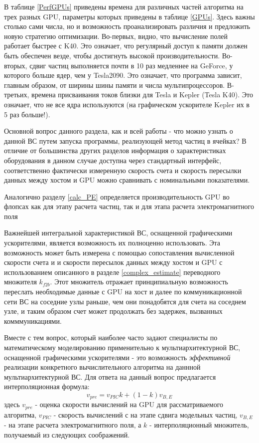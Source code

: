 В таблице \ref {PerfGPUs} приведены времена для различных частей алгоритма на трех разных GPU, параметры которых приведены в таблице \ref{GPUs}. Здесь важны столько сами числа, но и возможность проанализировать различия и предложить новую стратегию оптимизации. Во-первых, видно, что вычисление полей работает быстрее с K40. Это означает, что регулярный доступ к памяти должен быть обеспечен везде, чтобы достигнуть высокой производительности. Во-вторых, сдвиг частиц выполняется почти в 10 раз медленнее на  GeForce, у которого больше ядер, чем у Tesla2090. Это означает, что программа зависит, главным образом, от ширины шины памяти
и числа мультипроцессоров. В-третьих, времена присваивания токов  близки для Tesla и Kepler (Tesla K40). Это означает, что не все ядра используются (на графическом ускорителе Kepler их в 5 раз больше!).


Основной вопрос данного раздела, как и всей работы - что можно узнать о данной ВС путем запуска программы, реализующей метод частиц в ячейках? В отличие от 	большинства других разделов информация о характеристиках оборудования в данном случае доступна через стандартный интерфейс, соответственно фактически измеренную скорость счета и скорость пересылки данных между хостом и GPU можно сравнивать с номинальными показателями.

Аналогично разделу \ref{calc_PE} определяется производительность GPU во флопсах как для этапу расчета частиц, так и для этапа расчета электромагнитного поля

Важнейшей интегральной характеристикой ВС, оснащенной графическими ускорителями, является возможность их полноценно использовать. Эта возможность
может быть измерена с помощью сопоставления вычисленной скорости счета и и скорости пересылок данных между хостом и GPU с использованием описанного 
в разделе \ref{complex_estimate} переводного множителя $k_{f2b}$. Этот множитель отражает принципиальную возможность переслать необходимые данные с GPU на хост и далее по коммуникационной сети ВС на соседние узлы раньше, чем они понадобятся для счета на соседнем узле, и таким образом счет может продолжать без задержек, вызванных комммуникациями.

Вместе с тем вопрос, который наиболее часто задают специалисты по математическому моделированию применительно к мультиархитектурной ВС, оснащенной графическими ускорителями - это возможность \textit{эффективной} реализации конкретного вычислительного алгоритма на даннной мультиархитектурной ВС.
Для ответа на данный вопрос предлагается интерполяционная формула:
\begin{equation}
v_{pre} = v_{PIC} k + (1-k) v_{B,E}
\end{equation} 
здесь $ v_{pre}$ - оценка скорости вычислений на GPU для рассматриваемого алгоритма, $v_{PIC}$ - скорость вычислений с на этапе сдвига модельных частиц, $v_{B,E}$ - на этапе расчета электромагнитного поля, а $k$ - интерполяционный множитель, получаемый из следующих соображений.

